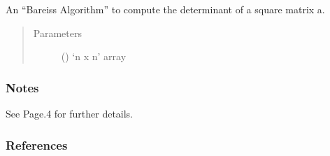 \documentclass[letterpaper,10pt,english]{sphinxmanual}
\begin{document}
\begin{fulllineitems}
An “Bareiss Algorithm” to compute the determinant of a square matrix a.
\begin{quote}\begin{description}
\item[{Parameters}] \leavevmode
{} () \textendash{} ‘n x n’ array

\end{description}\end{quote}
\subsubsection*{Notes}

See  Page.4 for further details.

\end{fulllineitems}

\subsubsection*{References}


\renewcommand{\indexname}{Python Module Index}
\begin{sphinxtheindex}
\let\bigletter\sphinxstyleindexlettergroup
\bigletter{a}
\item\relax{}
\end{sphinxtheindex}

\renewcommand{\indexname}{Index}
\printindex
\end{document}
